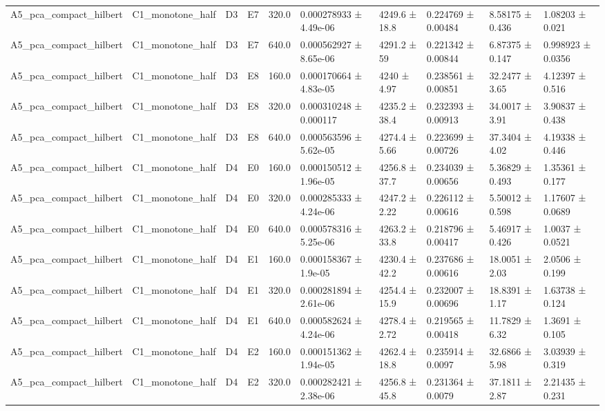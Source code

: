 \begin{table}
\begin{tabular}{llllllllll}
A5\_pca\_compact\_hilbert & C1\_monotone\_half & D3 & E7 & 320.0 & 0.000278933 ± 4.49e-06 & 4249.6 ± 18.8 & 0.224769 ± 0.00484 & 8.58175 ± 0.436 & 1.08203 ± 0.021 \\
A5\_pca\_compact\_hilbert & C1\_monotone\_half & D3 & E7 & 640.0 & 0.000562927 ± 8.65e-06 & 4291.2 ± 59 & 0.221342 ± 0.00844 & 6.87375 ± 0.147 & 0.998923 ± 0.0356 \\
A5\_pca\_compact\_hilbert & C1\_monotone\_half & D3 & E8 & 160.0 & 0.000170664 ± 4.83e-05 & 4240 ± 4.97 & 0.238561 ± 0.00851 & 32.2477 ± 3.65 & 4.12397 ± 0.516 \\
A5\_pca\_compact\_hilbert & C1\_monotone\_half & D3 & E8 & 320.0 & 0.000310248 ± 0.000117 & 4235.2 ± 38.4 & 0.232393 ± 0.00913 & 34.0017 ± 3.91 & 3.90837 ± 0.438 \\
A5\_pca\_compact\_hilbert & C1\_monotone\_half & D3 & E8 & 640.0 & 0.000563596 ± 5.62e-05 & 4274.4 ± 5.66 & 0.223699 ± 0.00726 & 37.3404 ± 4.02 & 4.19338 ± 0.446 \\
A5\_pca\_compact\_hilbert & C1\_monotone\_half & D4 & E0 & 160.0 & 0.000150512 ± 1.96e-05 & 4256.8 ± 37.7 & 0.234039 ± 0.00656 & 5.36829 ± 0.493 & 1.35361 ± 0.177 \\
A5\_pca\_compact\_hilbert & C1\_monotone\_half & D4 & E0 & 320.0 & 0.000285333 ± 4.24e-06 & 4247.2 ± 2.22 & 0.226112 ± 0.00616 & 5.50012 ± 0.598 & 1.17607 ± 0.0689 \\
A5\_pca\_compact\_hilbert & C1\_monotone\_half & D4 & E0 & 640.0 & 0.000578316 ± 5.25e-06 & 4263.2 ± 33.8 & 0.218796 ± 0.00417 & 5.46917 ± 0.426 & 1.0037 ± 0.0521 \\
A5\_pca\_compact\_hilbert & C1\_monotone\_half & D4 & E1 & 160.0 & 0.000158367 ± 1.9e-05 & 4230.4 ± 42.2 & 0.237686 ± 0.00616 & 18.0051 ± 2.03 & 2.0506 ± 0.199 \\
A5\_pca\_compact\_hilbert & C1\_monotone\_half & D4 & E1 & 320.0 & 0.000281894 ± 2.61e-06 & 4254.4 ± 15.9 & 0.232007 ± 0.00696 & 18.8391 ± 1.17 & 1.63738 ± 0.124 \\
A5\_pca\_compact\_hilbert & C1\_monotone\_half & D4 & E1 & 640.0 & 0.000582624 ± 4.24e-06 & 4278.4 ± 2.72 & 0.219565 ± 0.00418 & 11.7829 ± 6.32 & 1.3691 ± 0.105 \\
A5\_pca\_compact\_hilbert & C1\_monotone\_half & D4 & E2 & 160.0 & 0.000151362 ± 1.94e-05 & 4262.4 ± 18.8 & 0.235914 ± 0.0097 & 32.6866 ± 5.98 & 3.03939 ± 0.319 \\
A5\_pca\_compact\_hilbert & C1\_monotone\_half & D4 & E2 & 320.0 & 0.000282421 ± 2.38e-06 & 4256.8 ± 45.8 & 0.231364 ± 0.0079 & 37.1811 ± 2.87 & 2.21435 ± 0.231 \\

\end{tabular}
\end{table}
